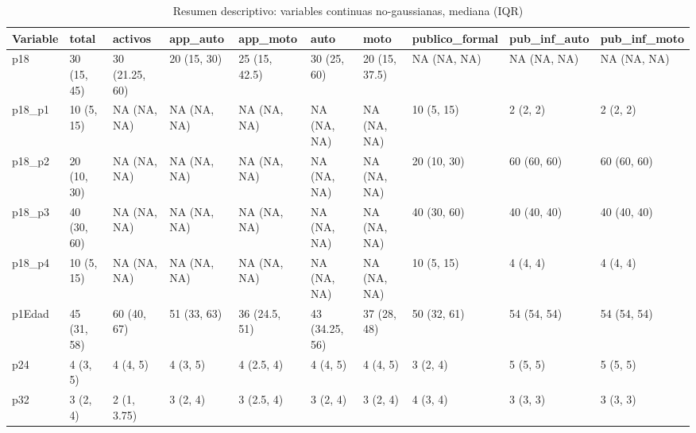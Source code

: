\begin{table}

\caption{Resumen descriptivo: variables continuas no-gaussianas, mediana (IQR)}
\centering
\begin{tabular}[t]{l|l|l|l|l|l|l|l|l|l}
\hline
Variable & total & activos & app\_auto & app\_moto & auto & moto & publico\_formal & pub\_inf\_auto & pub\_inf\_moto\\
\hline
p18 & 30 (15, 45) & 30 (21.25, 60) & 20 (15, 30) & 25 (15, 42.5) & 30 (25, 60) & 20 (15, 37.5) & NA (NA, NA) & NA (NA, NA) & NA (NA, NA)\\
\hline
p18\_p1 & 10 (5, 15) & NA (NA, NA) & NA (NA, NA) & NA (NA, NA) & NA (NA, NA) & NA (NA, NA) & 10 (5, 15) & 2 (2, 2) & 2 (2, 2)\\
\hline
p18\_p2 & 20 (10, 30) & NA (NA, NA) & NA (NA, NA) & NA (NA, NA) & NA (NA, NA) & NA (NA, NA) & 20 (10, 30) & 60 (60, 60) & 60 (60, 60)\\
\hline
p18\_p3 & 40 (30, 60) & NA (NA, NA) & NA (NA, NA) & NA (NA, NA) & NA (NA, NA) & NA (NA, NA) & 40 (30, 60) & 40 (40, 40) & 40 (40, 40)\\
\hline
p18\_p4 & 10 (5, 15) & NA (NA, NA) & NA (NA, NA) & NA (NA, NA) & NA (NA, NA) & NA (NA, NA) & 10 (5, 15) & 4 (4, 4) & 4 (4, 4)\\
\hline
p1Edad & 45 (31, 58) & 60 (40, 67) & 51 (33, 63) & 36 (24.5, 51) & 43 (34.25, 56) & 37 (28, 48) & 50 (32, 61) & 54 (54, 54) & 54 (54, 54)\\
\hline
p24 & 4 (3, 5) & 4 (4, 5) & 4 (3, 5) & 4 (2.5, 4) & 4 (4, 5) & 4 (4, 5) & 3 (2, 4) & 5 (5, 5) & 5 (5, 5)\\
\hline
p32 & 3 (2, 4) & 2 (1, 3.75) & 3 (2, 4) & 3 (2.5, 4) & 3 (2, 4) & 3 (2, 4) & 4 (3, 4) & 3 (3, 3) & 3 (3, 3)\\
\hline
\end{tabular}
\end{table}
